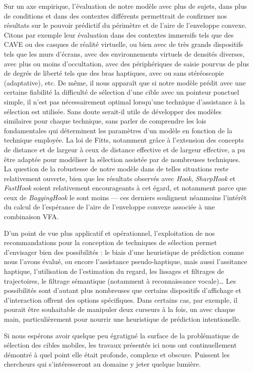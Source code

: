 	Sur un axe empirique, l'évaluation de notre modèle avec plus de sujets, dans plus de conditions et dans des contextes différents permettrait de confirmer nos résultats sur le pouvoir prédictif du périmètre et de l'aire de l'enveloppe convexe. Citons par exemple leur évaluation dans des contextes immersifs tels que des CAVE ou des casques de réalité virtuelle, ou bien avec de très grands dispositifs tels que les murs d'écrans, avec des environnements virtuels de densités diverses, avec plus ou moins d'occultation, avec des périphériques de saisie pourvus de plus de degrés de liberté tels que des bras haptiques, avec ou sans stéréoscopie (adaptative), etc. De même, il nous apparaît que si notre modèle prédit avec une certaine fiabilité la difficulté de sélection d'une cible avec un pointeur ponctuel simple, il n'est pas nécessairement optimal lorsqu'une technique d'assistance à la sélection est utilisée. Sans doute serait-il utile de développer des modèles similaires pour chaque technique, sans parler de comprendre les lois fondamentales qui déterminent les paramètres d'un modèle en fonction de la technique employée. La loi de Fitts, notamment grâce à l'extension des concepts de distance et de largeur à ceux de distance effective et de largeur effective, a pu être adaptée pour modéliser la sélection assistée par de nombreuses techniques. La question de la robustesse de notre modèle dans de telles situations reste relativement ouverte, bien que les résultats observés avec \emph{Hook}, \emph{SharpHook} et \emph{FastHook} soient relativement encourageants à cet égard, et notamment parce que ceux de \emph{BaggingHook} le sont moins --- ces derniers soulignent néanmoins l'intérêt du calcul de l'espérance de l'aire de l'enveloppe convexe associée à une combinaison VFA.
	
	D'un point de vue plus applicatif et opérationnel, l'exploitation de nos recommandations pour la conception de techniques de sélection permet d'envisager bien des possibilités : le biais d'une heuristique de prédiction comme nous l'avons évalué, ou encore l'assistance pseudo-haptique, mais aussi l'assitance haptique, l'utilisation de l'estimation du regard, les lissages et filtrages de trajectoires, le filtrage sémantique (notamment à reconnaissance vocale)\ldots{} Les possibilités sont d'autant plus nombreuses que certains dispositifs d'affichage et d'interaction offrent des options spécifiques. Dans certains cas, par exemple, il pourait être souhaitable de manipuler deux curseurs à la fois, un avec chaque main, particulièrement pour nourrir une heuristique de prédiction intentionelle.
	
	Si nous espérons avoir quelque peu égratigné la surface de la problématique de sélection des cibles mobiles, les travaux présentés ici nous ont continuellement démontré à quel point elle était profonde, complexe et obscure. Puissent les chercheurs qui s'intéresseront au domaine y jeter quelque lumière.